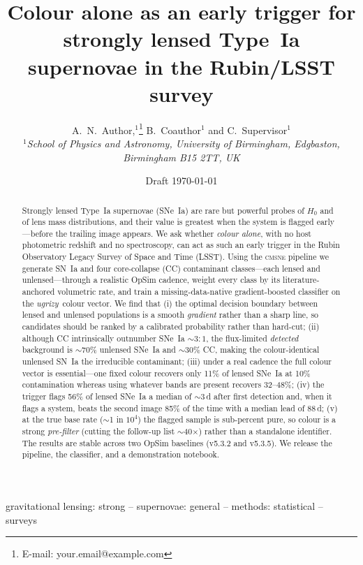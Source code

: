 \documentclass[fleqn,usenatbib]{mnras}
\title[Colour as an early trigger for lensed SNe~Ia]{Colour alone as an early
trigger for strongly lensed Type~Ia supernovae in the Rubin/LSST survey}
\author[Author et al.]{
A.~N.~Author,$^{1}$\thanks{E-mail: your.email@example.com}
B.~Coauthor$^{1}$
and C.~Supervisor$^{1}$
\\
$^{1}$\textit{School of Physics and Astronomy, University of Birmingham,
Edgbaston, Birmingham B15 2TT, UK}
}
\date{Draft \today}
\newcommand{\ugrizy}{\textit{ugrizy}}
\begin{document}
\label{firstpage}
\maketitle

\begin{abstract}
Strongly lensed Type~Ia supernovae (SNe~Ia) are rare but powerful probes of
$H_0$ and of lens mass distributions, and their value is greatest when the
system is flagged early---before the trailing image appears. We ask whether
\emph{colour alone}, with no host photometric redshift and no spectroscopy, can
act as such an early trigger in the Rubin Observatory Legacy Survey of Space and
Time (LSST). Using the \textsc{cmsne} pipeline we generate SN~Ia and four
core-collapse (CC) contaminant classes---each lensed and unlensed---through a
realistic OpSim cadence, weight every class by its literature-anchored
volumetric rate, and train a missing-data-native gradient-boosted classifier on
the \ugrizy\ colour vector. We find that (i) the optimal decision boundary
between lensed and unlensed populations is a smooth \emph{gradient} rather than a
sharp line, so candidates should be ranked by a calibrated probability rather
than hard-cut; (ii) although CC intrinsically outnumber SNe~Ia $\sim\!3\!:\!1$,
the flux-limited \emph{detected} background is $\sim$70\% unlensed SNe~Ia and
$\sim$30\% CC, making the colour-identical unlensed SN~Ia the irreducible
contaminant; (iii) under a real cadence the full colour vector is essential---one
fixed colour recovers only 11\% of lensed SNe~Ia at 10\% contamination whereas
using whatever bands are present recovers 32--48\%; (iv) the trigger flags 56\%
of lensed SNe~Ia a median of $\sim$3\,d after first detection and, when it flags
a system, beats the second image 85\% of the time with a median lead of 88\,d;
(v) at the true base rate ($\sim$1 in $10^4$) the flagged sample is sub-percent
pure, so colour is a strong \emph{pre-filter} (cutting the follow-up list
$\sim$40$\times$) rather than a standalone identifier. The results are stable
across two OpSim baselines (v5.3.2 and v5.3.5). We release the pipeline, the
classifier, and a demonstration notebook.
\end{abstract}

\begin{keywords}
gravitational lensing: strong -- supernovae: general -- methods: statistical --
surveys
\end{keywords}
\end{document}
